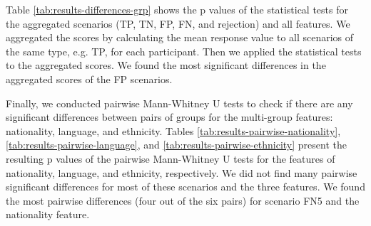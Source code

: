 %
Table \ref{tab:results-differences-grp} shows the p values of the statistical tests for the aggregated scenarios (TP, TN, FP, FN, and rejection) and all features.
%
We aggregated the scores by calculating the mean response value to all scenarios of the same type, e.g. TP, for each participant.
%
Then we applied the statistical tests to the aggregated scores.
%
We found the most significant differences in the aggregated scores of the FP scenarios.
%

%
Finally, we conducted pairwise Mann-Whitney U tests to check if there are any significant differences between pairs of groups for the multi-group features: nationality, language, and ethnicity.
%
Tables \ref{tab:results-pairwise-nationality}, \ref{tab:results-pairwise-language}, and \ref{tab:results-pairwise-ethnicity} present the resulting p values of the pairwise Mann-Whitney U tests for the features of nationality, language, and ethnicity, respectively.
%
We did not find many pairwise significant differences for most of these scenarios and the three features.
%
We found the most pairwise differences (four out of the six pairs) for scenario FN5 and the nationality feature.
%
